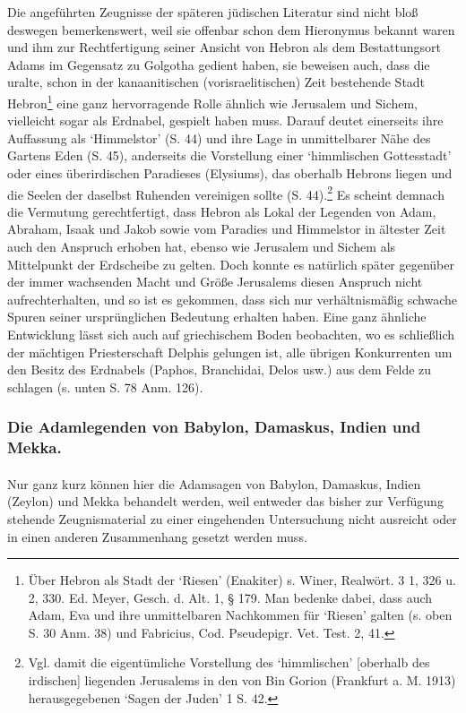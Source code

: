 \documentclass[a4paper, 11pt, oneside]{article}
\begin{document}
Die angeführten Zeugnisse der späteren jüdischen Literatur sind nicht bloß deswegen bemerkenswert, weil sie offenbar schon dem Hieronymus bekannt waren und ihm zur Rechtfertigung seiner Ansicht von Hebron als dem Bestattungsort Adams im Gegensatz zu Golgotha gedient haben, sie beweisen auch, dass die uralte, schon in der kanaanitischen (vorisraelitischen) Zeit bestehende Stadt Hebron\footnote{Über Hebron als Stadt der `Riesen' (Enakiter) s. Winer, Realwört. 3 1, 326 u. 2, 330. Ed. Meyer, Gesch. d. Alt. 1, § 179. Man bedenke dabei, dass auch Adam, Eva und ihre unmittelbaren Nachkommen für `Riesen' galten (s. oben S. 30 Anm. 38) und Fabricius, Cod. Pseudepigr. Vet. Test. 2, 41.} eine ganz hervorragende Rolle ähnlich wie Jerusalem und Sichem, vielleicht sogar als Erdnabel, gespielt haben muss. Darauf deutet einerseits ihre Auffassung als `Himmelstor' (S. 44) und ihre Lage in unmittelbarer Nähe des Gartens Eden (S. 45), anderseits die Vorstellung einer `himmlischen Gottesstadt' oder eines überirdischen Paradieses (Elysiums), das oberhalb Hebrons liegen und die Seelen der daselbst Ruhenden vereinigen sollte (S. 44).\footnote{Vgl. damit die eigentümliche Vorstellung des `himmlischen' [oberhalb des irdischen] liegenden Jerusalems in den von Bin Gorion (Frankfurt a. M. 1913) herausgegebenen `Sagen der Juden' 1 S. 42.} Es scheint demnach die Vermutung gerechtfertigt, dass Hebron als Lokal der Legenden von Adam, Abraham, Isaak und Jakob sowie vom Paradies und Himmelstor in ältester Zeit auch den Anspruch erhoben hat, ebenso wie Jerusalem und Sichem als Mittelpunkt der Erdscheibe zu gelten. Doch konnte es natürlich später gegenüber der immer wachsenden Macht und Größe Jerusalems diesen Anspruch nicht aufrechterhalten, und so ist es gekommen, dass sich nur verhältnismäßig schwache Spuren seiner ursprünglichen Bedeutung erhalten haben. Eine ganz ähnliche Entwicklung lässt sich auch auf griechischem Boden beobachten, wo es schließlich der mächtigen Priesterschaft Delphis gelungen ist, alle übrigen Konkurrenten um den Besitz des Erdnabels (Paphos, Branchidai, Delos usw.) aus dem Felde zu schlagen (s. unten S. 78 Anm. 126).

\subsubsection{Die Adamlegenden von Babylon, Damaskus, Indien und Mekka.}
\paragraph{}
Nur ganz kurz können hier die Adamsagen von Babylon, Damaskus, Indien (Zeylon) und Mekka behandelt werden, weil entweder das bisher zur Verfügung stehende Zeugnismaterial zu einer eingehenden Untersuchung nicht ausreicht oder in einen anderen Zusammenhang gesetzt werden muss.
\end{document}
